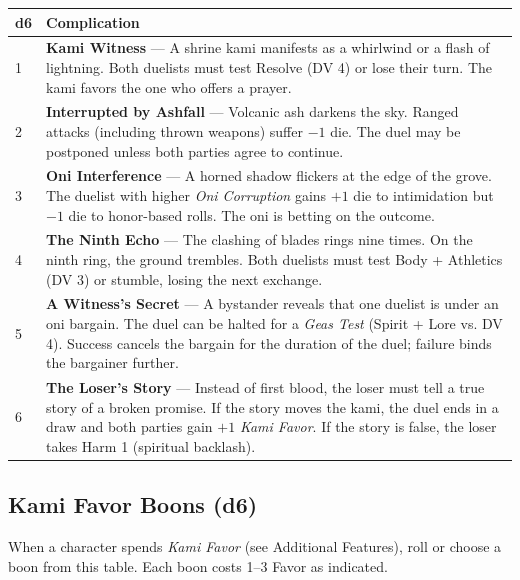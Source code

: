 \begin{longtable}{|p{1.5cm}|p{10cm}|}
\hline
\rowcolor{gray!20}
\textbf{d6} & \textbf{Complication} \\
\hline
1 & \textbf{Kami Witness} --- A shrine kami manifests as a whirlwind or a flash of lightning. Both duelists must test Resolve (DV 4) or lose their turn. The kami favors the one who offers a prayer. \\
\hline
2 & \textbf{Interrupted by Ashfall} --- Volcanic ash darkens the sky. Ranged attacks (including thrown weapons) suffer $-1$ die. The duel may be postponed unless both parties agree to continue. \\
\hline
3 & \textbf{Oni Interference} --- A horned shadow flickers at the edge of the grove. The duelist with higher \textit{Oni Corruption} gains $+1$ die to intimidation but $-1$ die to honor-based rolls. The oni is betting on the outcome. \\
\hline
4 & \textbf{The Ninth Echo} --- The clashing of blades rings nine times. On the ninth ring, the ground trembles. Both duelists must test Body + Athletics (DV 3) or stumble, losing the next exchange. \\
\hline
5 & \textbf{A Witness's Secret} --- A bystander reveals that one duelist is under an oni bargain. The duel can be halted for a \textit{Geas Test} (Spirit + Lore vs. DV 4). Success cancels the bargain for the duration of the duel; failure binds the bargainer further. \\
\hline
6 & \textbf{The Loser's Story} --- Instead of first blood, the loser must tell a true story of a broken promise. If the story moves the kami, the duel ends in a draw and both parties gain $+1$ \textit{Kami Favor}. If the story is false, the loser takes Harm 1 (spiritual backlash). \\
\hline
\end{longtable}

\subsection*{Kami Favor Boons (d6)}
\label{sec:nihori-kami-boons}

When a character spends \textit{Kami Favor} (see Additional Features), roll or choose a boon from this table. Each boon costs 1--3 Favor as indicated.

